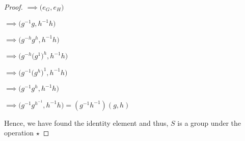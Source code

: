 \documentclass[executivepaper]{article}
\begin{document}
\begin{flushleft}
\begin{center}
\begin{proof}
\vspace{3mm}

$\implies \bigg(e_{G},e_{H}\bigg)$

\vspace{3mm}

$\implies \bigg(g^{-1}g,h^{-1}h\bigg)$

\vspace{3mm}

$\implies \bigg(g^{-h}g^h,h^{-1}h\bigg)$

\vspace{3mm}

$\implies \bigg(g^{-h}\bigg(g^1\bigg)^h,h^{-1}h\bigg)$

\vspace{3mm}

$\implies \bigg(g^{-1}\bigg(g^h\bigg)^1,h^{-1}h\bigg)$

\vspace{3mm}

$\implies \bigg(g^{-1}g^h,h^{-1}h\bigg)$

\pagebreak

\vspace*{-40mm}

$\implies \bigg(g^{-1}g^{h^{-1}},h^{-1}h\bigg)=(g^{-1}h^{-1})(g,h)$

\vspace{3mm}

Hence, we have found the identity element and thus, $S$ is a group under the operation $\star$

\end{proof}

\end{center}

\end{flushleft}
\end{document}
